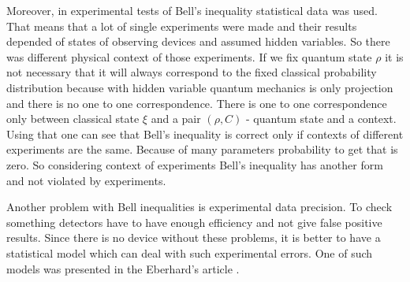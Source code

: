 \documentclass[11pt]{article}
\begin{document}
Moreover, in experimental tests of Bell's inequality statistical data was used. That means that a lot of single experiments were made and their results depended of states of observing devices and assumed hidden variables. So there was different physical context of those experiments. If we fix quantum state $\rho$ it is not necessary that it will always correspond to the fixed classical probability distribution because with hidden variable quantum mechanics is only projection and there is no one to one correspondence. There is one to one correspondence only between classical state $\xi$ and a pair $(\rho, C)$ - quantum state and a context. Using that one can see that Bell's inequality is correct only if contexts of different experiments are the same. Because of many parameters probability to get that is zero. So considering context of experiments Bell's inequality has another form and not violated by experiments.

Another problem with Bell inequalities is experimental data precision. To check something detectors have to have enough efficiency and not give false positive results. Since there is no device without these problems, it is better to have a statistical model which can deal with such experimental errors. One of such models was presented in the Eberhard's article \cite{Eberhard}.

%
%
%







\end{document}

